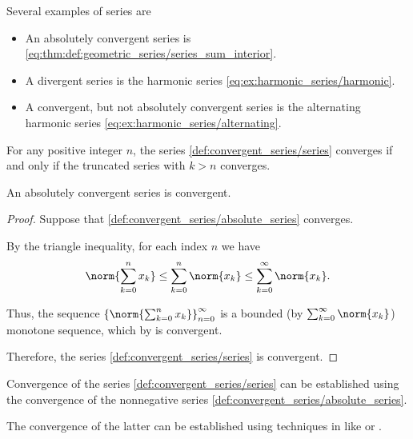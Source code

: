 \begin{example}\label{ex:series}
  Several examples of series are
  \begin{itemize}
    \item An absolutely convergent series is \eqref{eq:thm:def:geometric_series/series_sum_interior}.
    \item A divergent series is the harmonic series \eqref{eq:ex:harmonic_series/harmonic}.
    \item A convergent, but not absolutely convergent series is the alternating harmonic series \eqref{eq:ex:harmonic_series/alternating}.
  \end{itemize}
\end{example}

\begin{proposition}\label{thm:truncated_series_convergence}
  For any positive integer \( n \), the series \eqref{def:convergent_series/series} converges if and only if the truncated series with \( k > n \) converges.
\end{proposition}

\begin{proposition}\label{thm:absolutely_convergent_series_is_convergent}
  An absolutely convergent series is convergent.
\end{proposition}
\begin{proof}
  Suppose that \eqref{def:convergent_series/absolute_series} converges.

  By the triangle inequality, for each index \( n \) we have
  \begin{equation*}
    \norm{\sum_{k=0}^n x_k} \leq \sum_{k=0}^n \norm{x_k} \leq \sum_{k=0}^\infty \norm{x_k}.
  \end{equation*}

  Thus, the sequence \( \left\{ \norm{\sum_{k=0}^{n} x_k} \right\}_{n=0}^\infty \) is a bounded (by \( \sum_{k=0}^\infty \norm{x_k} \)) monotone sequence, which by  is convergent.

  Therefore, the series \eqref{def:convergent_series/series} is convergent.
\end{proof}

\begin{remark}\label{rem:establish_series_convergence_by_absolute_series}
  Convergence of the series \eqref{def:convergent_series/series} can be established using the convergence of the nonnegative series \eqref{def:convergent_series/absolute_series}.

  The convergence of the latter can be established using techniques in  like  or .
\end{remark}

